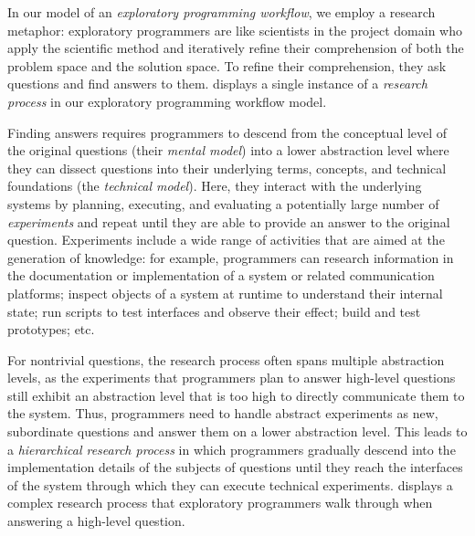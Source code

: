 In our model of an \emph{exploratory programming workflow}, we employ a research metaphor:
exploratory programmers are like scientists in the project domain who apply the scientific method and iteratively refine their comprehension of both the problem space and the solution space.
To refine their comprehension, they ask questions and find answers to them.
 displays a single instance of a \emph{research process} in our exploratory programming workflow model.

Finding answers requires programmers to descend from the conceptual level of the original questions (their \emph{mental model}) into a lower abstraction level where they can dissect questions into their underlying terms, concepts, and technical foundations (the \emph{technical model}).
Here, they interact with the underlying systems by planning, executing, and evaluating a potentially large number of \emph{experiments} and repeat until they are able to provide an answer to the original question.
Experiments include a wide range of activities that are aimed at the generation of knowledge:
for example, programmers can research information in the documentation or implementation of a system or related communication platforms; inspect objects of a system at runtime to understand their internal state; run scripts to test interfaces and observe their effect; build and test prototypes; etc.

For nontrivial questions, the research process often spans multiple abstraction levels, as the experiments that programmers plan to answer high-level questions still exhibit an abstraction level that is too high to directly communicate them to the system.
Thus, programmers need to handle abstract experiments as new, subordinate questions and answer them on a lower abstraction level.
This leads to a \emph{hierarchical research process} in which programmers gradually descend into the implementation details of the subjects of questions until they reach the interfaces of the system through which they can execute technical experiments.
 displays a complex research process that exploratory programmers walk through when answering a high-level question.


